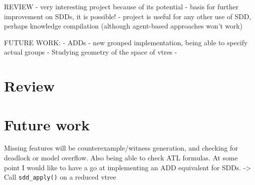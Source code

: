 \documentclass[11pt]{report}
\begin{document}
REVIEW
- very interesting project because of its potential
- basis for further improvement on SDDs, it is possible!
- project is useful for any other use of SDD, perhaps knowledge compilation (although agent-based approaches won't work)

FUTURE WORK: 
- ADDs
- new grouped implementation, being able to specify actual groups
- Studying geometry of the space of vtres
- 


\section{Review}

\section{Future work}

Missing features will be counterexample/witness generation, and checking for deadlock or model overflow. Also being able to check ATL formulas.
At some point I would like to have a go at implementing an ADD equivalent for SDDs.
-> Call \texttt{sdd\_apply()} on a reduced vtree
\end{document}
